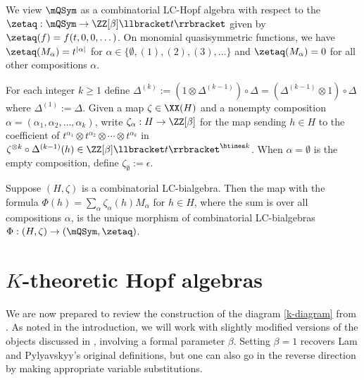 We view $\mQSym$ as a combinatorial LC-Hopf algebra with respect to
the  $\zetaq : \mQSym \to \ZZ[\beta]\llbracket t\rrbracket $ 
given by $\zetaq(f) = f(t,0,0,\dots)$.
On monomial quasisymmetric functions, we have 
$\zetaq(M_\alpha)   = t^{|\alpha|}$ for $\alpha\in\{\emptyset,(1),(2),(3),\dots\}$ and $\zetaq(M_\alpha)=0$ for all other compositions $\alpha$.

For each integer $k\geq 1$ define $\Delta^{(k)} := (1 \otimes \Delta^{(k-1)})\circ \Delta = ( \Delta^{(k-1)}\otimes 1 )\circ \Delta$ where $\Delta^{(1)}:=\Delta$. 
Given
a map $\zeta \in \XX(H)$ and a nonempty composition $\alpha
=(\alpha_1,\alpha_2,\dots,\alpha_k)$,
write $\zeta_\alpha : H \to \ZZ[\beta]$ for the map
sending $h \in H$ to the coefficient of 
$t^{\alpha_1}\otimes t^{\alpha_2}\otimes \cdots \otimes t^{\alpha_k}$
in $\zeta^{\otimes k} \circ \Delta^{(k-1)}(h) \in \ZZ[\beta]\llbracket t\rrbracket ^{\htimes k}$.
When $\alpha=\emptyset$ is the empty composition,
define $\zeta_\emptyset := \epsilon$.

\begin{theorem}[{\cite[Thm.~2.8]{LM2019}}]
\label{abs-thm}
Suppose $(H,\zeta)$ is a combinatorial LC-bialgebra.
Then 
the map with the formula
$\Phi(h) = \sum_\alpha \zeta_\alpha(h) M_\alpha$
for $h \in H$,
where the sum is over all compositions $\alpha$,
is the  unique morphism 
of combinatorial LC-bialgebras
$\Phi : (H,\zeta) \to (\mQSym,\zetaq)$.
\end{theorem}









 





 
\section{\texorpdfstring{$K$}{K}-theoretic Hopf algebras}\label{k-sect}

We are now prepared to review the construction of  
 the diagram  \eqref{k-diagram} from \cite{LamPyl}.
As noted in the introduction,
we will work with slightly modified versions of the objects discussed in \cite{LamPyl}, involving a formal parameter $\beta$. 
Setting $\beta=1$ recovers Lam and Pylyavskyy's original definitions, but one can
also go in the reverse direction by making appropriate variable substitutions.


